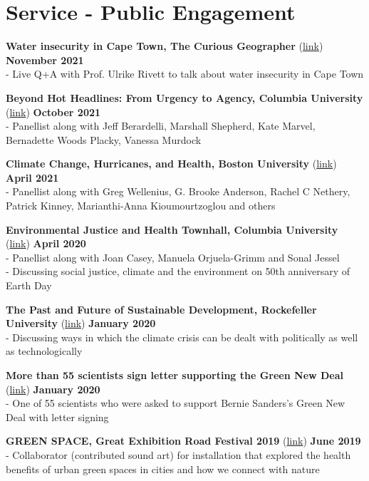 \section*{Service - Public Engagement}

\noindent \textbf{Water insecurity in Cape Town, The Curious Geographer} (\href{https://www.youtube.com/watch?v=5T58BXv41sE}{link}) \hfill \textbf{November 2021}\\
\noindent - Live Q+A with Prof. Ulrike Rivett to talk about water insecurity in Cape Town \medskip

\noindent \textbf{Beyond Hot Headlines: From Urgency to Agency, Columbia University} (\href{https://www.youtube.com/watch?v=4PMs3LOD13k}{link}) \hfill \textbf{October 2021}\\
\noindent - Panellist along with Jeff Berardelli, Marshall Shepherd, Kate Marvel, Bernadette Woods Placky, Vanessa Murdock \medskip

\noindent \textbf{Climate Change, Hurricanes, and Health, Boston University} (\href{https://bit.ly/2TfExZb}{link}) \hfill \textbf{April 2021}\\
\noindent - Panellist along with Greg Wellenius, G. Brooke Anderson, Rachel C Nethery, Patrick Kinney, Marianthi-Anna Kioumourtzoglou and others \medskip

\noindent \textbf{Environmental Justice and Health Townhall, Columbia University} (\href{https://bit.ly/3bsdZZ3}{link}) \hfill \textbf{April 2020}\\
\noindent - Panellist along with Joan Casey, Manuela Orjuela-Grimm and Sonal Jessel\\
\noindent - Discussing social justice, climate and the environment on 50th anniversary of Earth Day \medskip

\noindent \textbf{The Past and Future of Sustainable Development, Rockefeller University} (\href{https://bit.ly/2UoPrdD}{link}) \hfill \textbf{January 2020}\\
\noindent - Discussing ways in which the climate crisis can be dealt with politically as well as technologically \medskip

\noindent \textbf{More than 55 scientists sign letter supporting the Green New Deal}  (\href{https://bit.ly/2uiY1Qz}{link}) \hfill \textbf{January 2020}\\
\noindent - One of 55 scientists who were asked to support Bernie Sanders's Green New Deal with letter signing \medskip

\noindent \textbf{GREEN SPACE, Great Exhibition Road Festival 2019} (\href{https://bit.ly/3vMnnk5}{link}) \hfill \textbf{June 2019}\\
\noindent - Collaborator (contributed sound art) for installation that explored the health benefits of urban green spaces in cities and how we connect with nature \medskip

